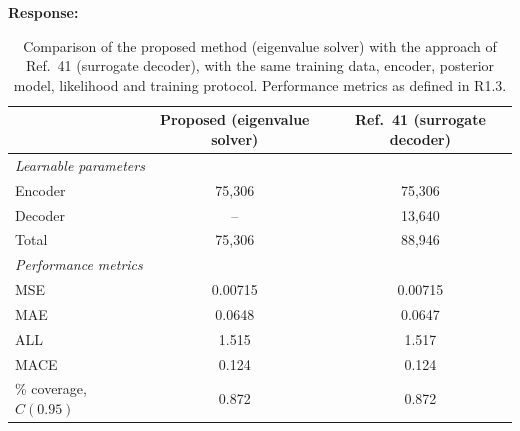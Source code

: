 \documentclass[11pt]{article}
\newenvironment{response}{\par\smallskip\noindent\color{resp}\textbf{Response:}\ }{\par}
\begin{document}
\begin{response}
	\begin{table}[H]
		\centering\small
		\caption{Comparison of the proposed method (eigenvalue solver) with the approach of Ref.~41 (surrogate decoder), with
			the same training data, encoder, posterior model, likelihood and training protocol. Performance metrics as defined
			in R1.3.}
		\label{tab:surrogate}
		\begin{tabular}{lcc}
			\toprule
			& Proposed (eigenvalue solver) & Ref.~41 (surrogate decoder) \\
			\midrule
			\multicolumn{3}{l}{\emph{Learnable parameters}} \\
			\quad Encoder & 75,306 & 75,306 \\
			\quad Decoder & -- & 13,640 \\
			\quad Total & 75,306 & 88,946 \\
			\midrule
			\multicolumn{3}{l}{\emph{Performance metrics}} \\
			\quad MSE & 0.00715 & 0.00715 \\
			\quad MAE & 0.0648 & 0.0647 \\
			\quad ALL & 1.515 & 1.517 \\
			\quad MACE & 0.124 & 0.124 \\
			\quad 95\% coverage, $C(0.95)$ & 0.872 & 0.872 \\
			\bottomrule
		\end{tabular}
	\end{table}


\end{response}
\end{document}
